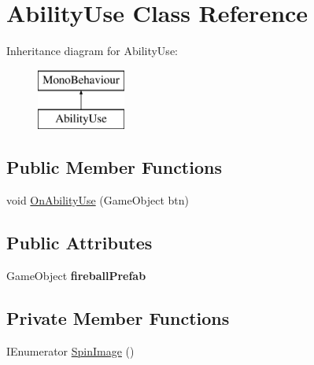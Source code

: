 \hypertarget{class_ability_use}{}\section{Ability\+Use Class Reference}
\label{class_ability_use}
Inheritance diagram for Ability\+Use\+:\begin{figure}[H]
\begin{center}
\leavevmode
\includegraphics[height=2.000000cm]{class_ability_use}
\end{center}
\end{figure}
\subsection*{Public Member Functions}
\begin{DoxyCompactItemize}
\item 
void \hyperlink{class_ability_use_a5dcf922cb131580a2ba04d6c39d057e8}{On\+Ability\+Use} (Game\+Object btn)
\end{DoxyCompactItemize}
\subsection*{Public Attributes}
\begin{DoxyCompactItemize}
\item 
\mbox{\label{class_ability_use_aa0acead332c1452ed797214e29f7e8ec}} 
Game\+Object {\bfseries fireball\+Prefab}
\end{DoxyCompactItemize}
\subsection*{Private Member Functions}
\begin{DoxyCompactItemize}
\item 
I\+Enumerator \hyperlink{class_ability_use_a59af761fa480e127524d0948dda9bd80}{Spin\+Image} ()
\end{DoxyCompactItemize}
